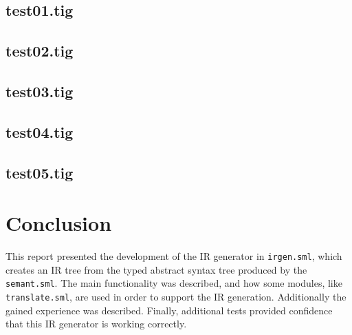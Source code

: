 \documentclass{article}
\begin{document}
\subsection{test01.tig}



\subsection{test02.tig}






\subsection{test03.tig}



\subsection{test04.tig}



\subsection{test05.tig}




\section{Conclusion}
This report presented the development of the IR generator in \texttt{irgen.sml}, which creates an IR tree from the typed abstract syntax tree produced by the \texttt{semant.sml}. The main functionality was described, and how some modules, like \texttt{translate.sml}, are used in order to support the IR generation. Additionally the gained experience was described. Finally, additional tests provided confidence that this IR generator is working correctly.
\end{document}
